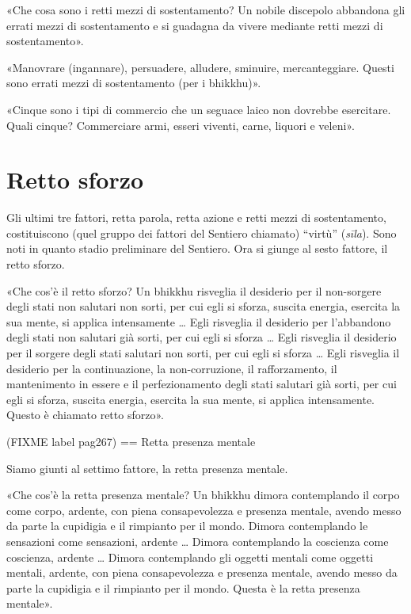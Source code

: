  «Che cosa sono i retti mezzi di sostentamento? Un nobile
discepolo abbandona gli errati mezzi di sostentamento e si guadagna da
vivere mediante retti mezzi di sostentamento».




«Manovrare (ingannare), persuadere, alludere, sminuire, mercanteggiare.
Questi sono errati mezzi di sostentamento (per i bhikkhu)».




«Cinque sono i tipi di commercio che un seguace laico non dovrebbe
esercitare. Quali cinque? Commerciare armi, esseri viventi, carne,
liquori e veleni».




\hypertarget{x-retto-sforzo}{\section*{Retto sforzo}}
 Gli ultimi tre fattori, retta parola, retta azione e
retti mezzi di sostentamento, costituiscono (quel gruppo dei fattori del
Sentiero chiamato) “virtù” (\emph{sīla}). Sono noti in quanto stadio
preliminare del Sentiero. Ora si giunge al sesto fattore, il retto
sforzo.


 «Che cos’è il retto sforzo? Un bhikkhu risveglia il
desiderio per il non-sorgere degli stati non salutari non sorti, per cui
egli si sforza, suscita energia, esercita la sua mente, si applica
intensamente … Egli risveglia il desiderio per l’abbandono degli stati
non salutari già sorti, per cui egli si sforza … Egli risveglia il
desiderio per il sorgere degli stati salutari non sorti, per cui egli si
sforza … Egli risveglia il desiderio per la continuazione, la
non-corruzione, il rafforzamento, il mantenimento in essere e il
perfezionamento degli stati salutari già sorti, per cui egli si sforza,
suscita energia, esercita la sua mente, si applica intensamente. Questo
è chiamato retto sforzo».




(FIXME label pag267)
== Retta presenza mentale


 Siamo giunti al settimo fattore, la retta presenza
mentale.


 «Che cos’è la retta presenza mentale? Un bhikkhu dimora
contemplando il corpo come corpo, ardente, con piena consapevolezza e
presenza mentale, avendo messo da parte la cupidigia e il rimpianto per
il mondo. Dimora contemplando le sensazioni come sensazioni, ardente …
Dimora contemplando la coscienza come coscienza, ardente … Dimora
contemplando gli oggetti mentali come oggetti mentali, ardente, con
piena consapevolezza e presenza mentale, avendo messo da parte la
cupidigia e il rimpianto per il mondo. Questa è la retta presenza
mentale».


